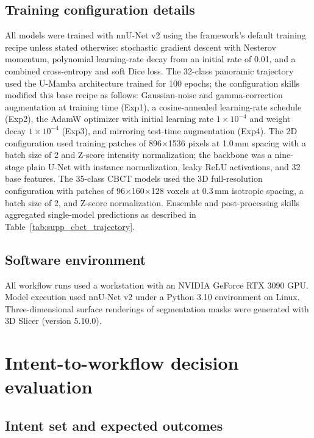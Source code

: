 \documentclass[final,5p,times,twocolumn]{elsarticle}
\begin{document}
\subsection{Training configuration details}

All models were trained with nnU-Net v2 using the framework's default training recipe unless stated otherwise: stochastic gradient descent with Nesterov momentum, polynomial learning-rate decay from an initial rate of 0.01, and a combined cross-entropy and soft Dice loss. The 32-class panoramic trajectory used the U-Mamba architecture trained for 100 epochs; the configuration skills modified this base recipe as follows: Gaussian-noise and gamma-correction augmentation at training time (Exp1), a cosine-annealed learning-rate schedule (Exp2), the AdamW optimizer with initial learning rate $1\times10^{-4}$ and weight decay $1\times10^{-4}$ (Exp3), and mirroring test-time augmentation (Exp4). The 2D configuration used training patches of 896$\times$1536 pixels at 1.0\,mm spacing with a batch size of 2 and Z-score intensity normalization; the backbone was a nine-stage plain U-Net with instance normalization, leaky ReLU activations, and 32 base features. The 35-class CBCT models used the 3D full-resolution configuration with patches of 96$\times$160$\times$128 voxels at 0.3\,mm isotropic spacing, a batch size of 2, and Z-score normalization. Ensemble and post-processing skills aggregated single-model predictions as described in Table~\ref{tab:supp_cbct_trajectory}.

\subsection{Software environment}

All workflow runs used a workstation with an NVIDIA GeForce RTX 3090 GPU. Model execution used nnU-Net v2 under a Python 3.10 environment on Linux. Three-dimensional surface renderings of segmentation masks were generated with 3D Slicer (version 5.10.0).

\section{Intent-to-workflow decision evaluation}

\subsection{Intent set and expected outcomes}
\end{document}
